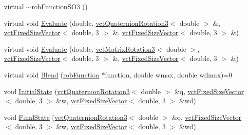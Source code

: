 \begin{DoxyCompactItemize}
\item 
virtual \hyperlink{classrob_function_s_o3_ac3dfa61cd91175c48c11f49c0d03f6ac}{$\sim$rob\-Function\-S\-O3} ()
\item 
virtual void \hyperlink{classrob_function_s_o3_a1c7d71ed0dbd9fb669af528372dd49ca}{Evaluate} (double, \hyperlink{classvct_quaternion_rotation3}{vct\-Quaternion\-Rotation3}$<$ double $>$ \&, \hyperlink{classvct_fixed_size_vector}{vct\-Fixed\-Size\-Vector}$<$ double, 3 $>$ \&, \hyperlink{classvct_fixed_size_vector}{vct\-Fixed\-Size\-Vector}$<$ double, 3 $>$ \&)
\item 
virtual void \hyperlink{classrob_function_s_o3_af618229526d1430e0b27556499336fb0}{Evaluate} (double, \hyperlink{classvct_matrix_rotation3}{vct\-Matrix\-Rotation3}$<$ double $>$, \hyperlink{classvct_fixed_size_vector}{vct\-Fixed\-Size\-Vector}$<$ double, 3 $>$ \&, \hyperlink{classvct_fixed_size_vector}{vct\-Fixed\-Size\-Vector}$<$ double, 3 $>$ \&)
\item 
virtual void \hyperlink{classrob_function_s_o3_a490d756026b0030048f084baf97ee34b}{Blend} (\hyperlink{classrob_function}{rob\-Function} $\ast$function, double wmax, double wdmax)=0
\item 
void \hyperlink{classrob_function_s_o3_a702e17e3369caeded7947142dbf8d763}{Initial\-State} (\hyperlink{classvct_quaternion_rotation3}{vct\-Quaternion\-Rotation3}$<$ double $>$ \&q, \hyperlink{classvct_fixed_size_vector}{vct\-Fixed\-Size\-Vector}$<$ double, 3 $>$ \&w, \hyperlink{classvct_fixed_size_vector}{vct\-Fixed\-Size\-Vector}$<$ double, 3 $>$ \&wd)
\item 
void \hyperlink{classrob_function_s_o3_a5c81753e7ae451aadd29201e1608e395}{Final\-State} (\hyperlink{classvct_quaternion_rotation3}{vct\-Quaternion\-Rotation3}$<$ double $>$ \&q, \hyperlink{classvct_fixed_size_vector}{vct\-Fixed\-Size\-Vector}$<$ double, 3 $>$ \&w, \hyperlink{classvct_fixed_size_vector}{vct\-Fixed\-Size\-Vector}$<$ double, 3 $>$ \&wd)
\end{DoxyCompactItemize}
